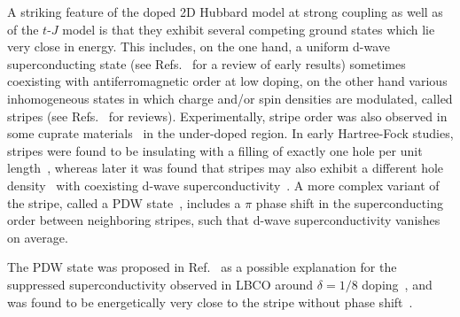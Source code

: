\documentclass{ar-1col}
\begin{document}
A striking feature of the doped 2D Hubbard model at strong coupling as well as of the $t$-$J$ model is that they exhibit several competing ground states which lie very close in energy. This includes, on the one hand, a uniform d-wave superconducting state (see Refs.~\cite{Dagotto94,Bulut02,Maier05A,Tremblay06,Scalapino07} for a review of early results) 
sometimes coexisting with antiferromagnetic order at low doping, on the other hand various inhomogeneous states in which charge and/or spin densities are modulated, called stripes (see Refs.~\cite{Vojta09,Fradkin15,Kloss16,Agterberg20} for reviews). Experimentally, stripe order was also observed in some cuprate materials~\cite{Tranquada95} in the
under-doped region. In early Hartree-Fock studies, stripes were found to be insulating with a filling of exactly one hole per unit length~\cite{Zaanen89, Poilblanc89}, %
 whereas later it was found that stripes may also exhibit a different hole density~\cite{White98, White98b, White03} with  coexisting d-wave superconductivity~\cite{White99,Himeda02,White09,Corboz11,Corboz14,Zheng16}. A more complex variant of the stripe, called a PDW state~\cite{Agterberg20}, includes a $\pi$ phase shift in the superconducting order between neighboring stripes, such that d-wave superconductivity vanishes on average.\begin{marginnote}
\end{marginnote}The PDW state was proposed in Ref.~\cite{Berg07} as a possible explanation for the suppressed superconductivity observed in LBCO around $\delta=1/8$ doping~\cite{Li07}, and was found to be energetically very close to the stripe without phase shift~\cite{Himeda02,Raczkowski07,Corboz14}.
\end{document}
